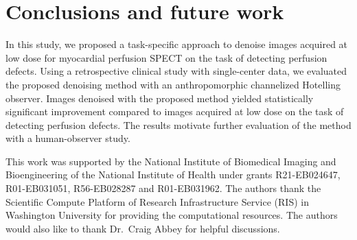 \documentclass[]{spie}  %
\begin{document}
\section{Conclusions and future work}
In this study, we proposed a task-specific approach to denoise images acquired at low dose for myocardial perfusion SPECT on the task of detecting perfusion defects. Using a retrospective clinical study with single-center data, we evaluated the proposed denoising method with an anthropomorphic channelized Hotelling observer. Images denoised with the proposed method yielded statistically significant improvement compared to images acquired at low dose on the task of detecting perfusion defects. The results motivate further evaluation of the method with a human-observer study.

\acknowledgments %
This work was supported by the National Institute of Biomedical Imaging and Bioengineering of the National Institute of Health under grants R21-EB024647, R01-EB031051, R56-EB028287 and R01-EB031962.
The authors thank the Scientific Compute Platform of Research Infrastructure Service (RIS) in Washington University for providing the computational resources.
The authors would also like to thank Dr.~Craig Abbey for helpful discussions.

\end{document}
